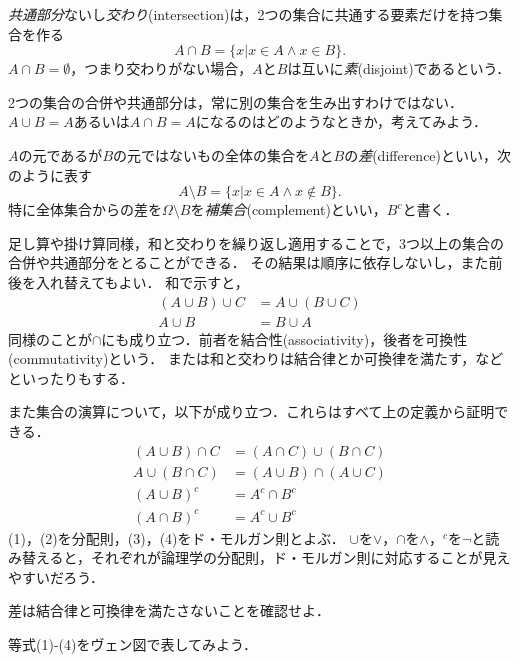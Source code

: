 \documentclass[11pt,a4paper]{jsarticle}
\begin{document}
\emph{共通部分}ないし\emph{交わり}(intersection)は，2つの集合に共通する要素だけを持つ集合を作る
\[
 A \cap B = \{ x | x \in A \wedge x \in B\}.
\]
$A \cap B = \emptyset$，つまり交わりがない場合，$A$と$B$は互いに\emph{素}(disjoint)であるという．

\begin{attn}
 2つの集合の合併や共通部分は，常に別の集合を生み出すわけではない．$A \cup B = A$あるいは$A \cap B = A$になるのはどのようなときか，考えてみよう．
\end{attn}


$A$の元であるが$B$の元ではないもの全体の集合を$A$と$B$の\emph{差}(difference)といい，次のように表す
\[
 A \setminus B = \{ x | x \in A \wedge x \not\in B\}.
\]
特に全体集合からの差を$\Omega \setminus B$を\emph{補集合}(complement)といい，$B^c$と書く．

足し算や掛け算同様，和と交わりを繰り返し適用することで，3つ以上の集合の合併や共通部分をとることができる．
その結果は順序に依存しないし，また前後を入れ替えてもよい．
和で示すと，
\begin{align*}
 (A \cup B) \cup C & = A \cup (B \cup C) \\
 A \cup B & = B \cup A
\end{align*}
同様のことが$\cap$にも成り立つ．前者を結合性(associativity)，後者を可換性(commutativity)という．
または和と交わりは結合律とか可換律を満たす，などといったりもする．

また集合の演算について，以下が成り立つ．これらはすべて上の定義から証明できる．
\begin{align}
(A \cup B) \cap C &= (A \cap C) \cup (B \cap C) \\
A \cup (B \cap C) &= (A \cup B) \cap (A \cup C) \\
(A \cup B)^c &= A^c \cap B^c \\
(A \cap B)^c &= A^c \cup B^c
\end{align}
(1)，(2)を分配則，(3)，(4)をド・モルガン則とよぶ．
$\cup$を$\vee$，$\cap$を$\wedge$，$^c$を$\neg$と読み替えると，それぞれが論理学の分配則，ド・モルガン則に対応することが見えやすいだろう．


\begin{exercise}
差は結合律と可換律を満たさないことを確認せよ．
\end{exercise}


\begin{exercise}
等式(1)-(4)をヴェン図で表してみよう．
\end{exercise}
\end{document}
